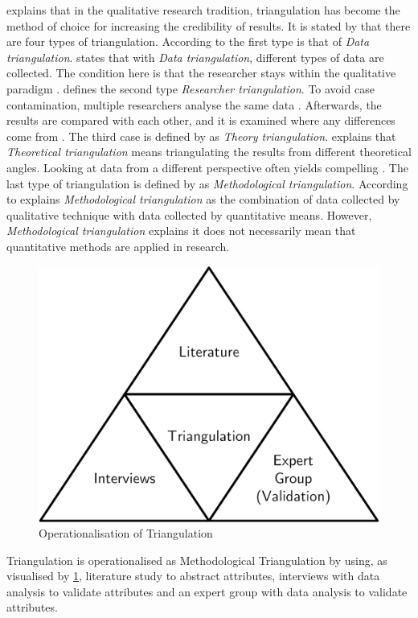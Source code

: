 \textcite[p.~481]{Mortelmans2018} explains that in the qualitative research tradition, \gls{triangulation} has become the method of choice for increasing the credibility of results. It is stated by \textcite[p.~481]{Mortelmans2018} that there are four types of \gls{triangulation}. According to \textcite[p.~88]{Mortelmans2018} the first type is that of \textit{Data \Gls{triangulation}}. \textcite[p.~481]{Mortelmans2018} states that with \textit{Data \Gls{triangulation}}, different types of data are collected. The condition here is that the researcher stays within the qualitative paradigm \parencite[p.~481]{Mortelmans2018}. \textcite[p.~481]{Mortelmans2018} defines the second type \textit{Researcher \Gls{triangulation}}. To avoid case contamination, multiple researchers analyse the same data \parencite[p.~482]{Mortelmans2018}. Afterwards, the results are compared with each other, and it is examined where any differences come from \parencite[p.~482]{Mortelmans2018}. The third case is defined by \textcite[p.~481]{Mortelmans2018} as \textit{Theory \Gls{triangulation}}. \textcite[p.~482]{Mortelmans2018} explains that \textit{Theoretical \Gls{triangulation}} means triangulating the results from different theoretical angles. Looking at data from a different perspective often yields compelling \parencite[p.~482]{Mortelmans2018}. The last type of \gls{triangulation} is defined by \textcite[p.~481]{Mortelmans2018} as \textit{Methodological \Gls{triangulation}}. According to \textcite[p.~483]{Mortelmans2018} explains \textit{Methodological \Gls{triangulation}} as the combination of data collected by qualitative technique with data collected by quantitative means. However, \textcite[p.~483]{Mortelmans2018}\textit{Methodological \Gls{triangulation}} explains it does not necessarily mean that quantitative methods are applied in research. 
\begin{figure}[H]
	\centering
	\includegraphics[width=0.5\linewidth]{images/triangulation}
	\caption[Operationalisation of Triangulation]{Operationalisation of Triangulation}
	\label{fig:triangulation}
\end{figure}
Triangulation is operationalised as Methodological Triangulation by using, as visualised by \cref{fig:triangulation}, literature study to abstract attributes, interviews with data analysis to validate attributes and an expert group with data analysis to validate attributes.







